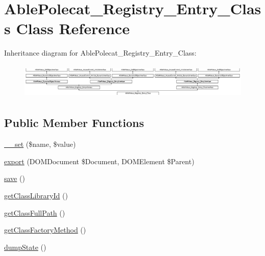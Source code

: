 \hypertarget{class_able_polecat___registry___entry___class}{}\section{Able\+Polecat\+\_\+\+Registry\+\_\+\+Entry\+\_\+\+Class Class Reference}
\label{class_able_polecat___registry___entry___class}
Inheritance diagram for Able\+Polecat\+\_\+\+Registry\+\_\+\+Entry\+\_\+\+Class\+:\begin{figure}[H]
\begin{center}
\leavevmode
\includegraphics[height=1.707317cm]{class_able_polecat___registry___entry___class}
\end{center}
\end{figure}
\subsection*{Public Member Functions}
\begin{DoxyCompactItemize}
\item 
\hyperlink{class_able_polecat___registry___entry___class_a83c2703c91959192f759992ad5640b67}{\+\_\+\+\_\+set} (\$name, \$value)
\item 
\hyperlink{class_able_polecat___registry___entry___class_a0a05b2e4b3a44390eeb042064e427b1a}{export} (D\+O\+M\+Document \$Document, D\+O\+M\+Element \$Parent)
\item 
\hyperlink{class_able_polecat___registry___entry___class_afc8a3c62679cf00ade9f15fb2a6d6132}{save} ()
\item 
\hyperlink{class_able_polecat___registry___entry___class_a51ab292213d530e6ec65ef6c1a59b244}{get\+Class\+Library\+Id} ()
\item 
\hyperlink{class_able_polecat___registry___entry___class_a007ade3aa1414f464fe5670e2ee3b3e5}{get\+Class\+Full\+Path} ()
\item 
\hyperlink{class_able_polecat___registry___entry___class_a1234be8925a14bd9f504ebd18a16b4ed}{get\+Class\+Factory\+Method} ()
\item 
\hyperlink{class_able_polecat___registry___entry___class_a360f67f13d61bf6813ff78d869d9fca6}{dump\+State} ()
\end{DoxyCompactItemize}
